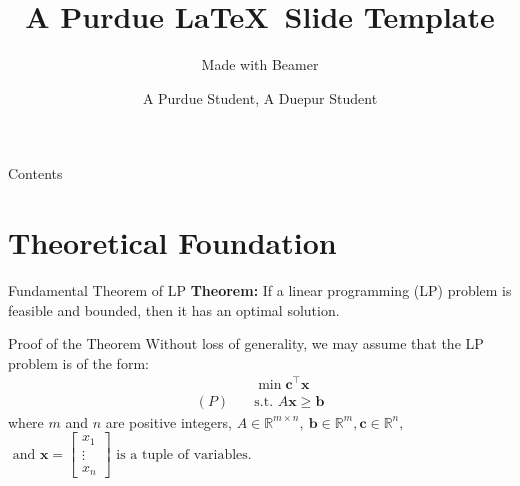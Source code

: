 \documentclass{purdue-slide}
\title{A Purdue \LaTeX\ Slide Template}
\subtitle{Made with Beamer}
\author{A Purdue Student\texorpdfstring{\footnotemark[1]}{}, A Duepur Student\texorpdfstring{\footnotemark[2]}{}}
\begin{document}
\begin{titleframe}{}
	\maketitle
\end{titleframe}

\begin{frame}{Contents}
	\tableofcontents
\end{frame}

\section{Theoretical Foundation}

\begin{frame}{Fundamental Theorem of LP}
	\textbf{Theorem:} If a linear programming (LP) problem is feasible and bounded, then it has an optimal solution.
\end{frame}

\begin{frame}{Proof of the Theorem}
	Without loss of generality, we may assume that the LP problem is of the form:
	\[
		\begin{aligned}
			& \min \mathbf{c}^\top \mathbf{x} \\
			(P) \quad & \text{s.t. } A\mathbf{x} \geq \mathbf{b}
		\end{aligned}
	\]
	where $m$ and $n$ are positive integers,  $A \in \mathbb{R}^{m \times n}, \ \mathbf{b} \in \mathbb{R}^m, \mathbf{c} \in \mathbb{R}^n,$ $ \text{ and }
	\mathbf{x} =
	\begin{bmatrix}
		x_1 \\
		\vdots \\
		x_n
	\end{bmatrix} \text{ is a tuple of variables. }$

\end{frame}
\end{document}
